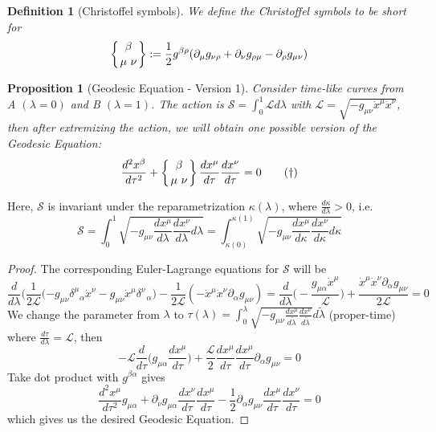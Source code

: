 \documentclass[a4paper]{article}
\theoremstyle{new}
\newtheorem{defi}{Definition}[section]
\newtheorem{prop}{Proposition}[section]
\begin{document}
\begin{defi}[Christoffel symbols]
We define the Christoffel symbols to be short for
$$\left \{ {\beta \atop
\mu\ \nu}\right \}:=\frac{1}{2}g^{\beta\rho}(\partial_\mu g_{\nu\rho}+\partial_\nu g_{\rho\mu}-\partial_\rho g_{\mu\nu})$$
\end{defi}
\begin{prop}[Geodesic Equation - Version 1]
Consider time-like curves from  A $(\lambda=0)$ and B $(\lambda=1)$. The action is $\mathcal{S}=\int_0^1\mathcal{L}d\lambda$ with $\mathcal{L}=\sqrt{-g_{\mu\nu}\dot{x}^\mu\dot{x}^\nu}$, then after extremizing the action, we will obtain one possible version of the Geodesic Equation:
\begin{equation}
    \frac{d^2x^\beta}{d\tau^2}+\left \{ {\beta \atop \mu\ \nu}\right \}\frac{dx^\mu}{d\tau}\frac{dx^\nu}{d\tau}=0\tag{\dag}
\end{equation}
\end{prop}
Here, $\mathcal{S}$ is invariant under the reparametrization $\kappa(\lambda)$, where $\frac{d\kappa}{d\lambda}>0$, i.e. 
$$\mathcal{S}=\int_0^1\sqrt{-g_{\mu\nu}\frac{dx^\mu}{d\lambda}\frac{dx^\nu}{d\lambda}d\lambda}=\int_{\kappa(0)}^{\kappa(1)}\sqrt{-g_{\mu\nu}\frac{dx^\mu}{d\kappa}\frac{dx^\nu}{d\kappa}d\kappa}$$
\begin{proof}
The corresponding Euler-Lagrange equations for $\mathcal{S}$ will be 
$$\frac{d}{d\lambda}\bigg(\frac{1}{2\mathcal{L}}(-g_{\mu\nu}\delta^\mu_{\text{ }\alpha}\dot{x}^\nu-g_{\mu\nu}\dot{x}^\mu\delta^\nu_{\text{  }\alpha}\bigg)-\frac{1}{2\mathcal{L}}(-\dot{x}^\mu\dot{x}^\nu\partial_\alpha g_{\mu\nu})=\frac{d}{d\lambda}\bigg(-\frac{g_{\mu\alpha}\dot{x}^\mu}{\mathcal{L}}\bigg)+\frac{\dot{x}^\mu\dot{x}^\nu\partial_\alpha g_{\mu\nu}}{2\mathcal{L}}=0$$
We change the parameter from $\lambda$ to $\tau(\lambda)=\int_0^\lambda\sqrt{-g_{\mu\nu}\frac{dx^\mu}{d\tilde{\lambda}}\frac{dx^\nu}{d\tilde{\lambda}}}d\tilde{\lambda}$ (proper-time) where $\frac{d\tau}{d\lambda}=\mathcal{L}$, then
$$-\mathcal{L}\frac{d}{d\tau}\bigg(g_{\mu\alpha}\frac{dx^\mu}{d\tau}\bigg)+\frac{\mathcal{L}}{2}\frac{dx^\mu}{d\tau}\frac{dx^\mu}{d\tau}\partial_\alpha g_{\mu\nu}=0$$
Take dot product with $g^{\beta\alpha}$ gives
$$\frac{d^2x^\mu}{d\tau^2}g_{\mu\alpha}+\partial_\nu g_{\mu\alpha}\frac{dx^\nu}{d\tau}\frac{dx^\mu}{d\tau}-\frac{1}{2}\partial_\alpha g_{\mu\nu}\frac{dx^\mu}{d\tau}\frac{dx^\nu}{d\tau}=0$$
which gives us the desired Geodesic Equation. 
\end{proof}
\end{document}
